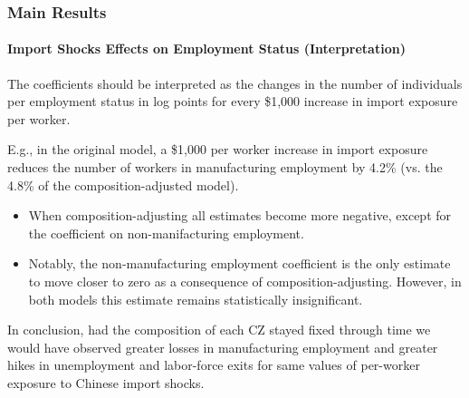 \begin{frame}
    \frametitle{Main Results}
    \framesubtitle{Import Shocks Effects on Employment Status (Interpretation)}
    
    The coefficients should be interpreted as the changes in the number of individuals per employment status in log points for every \$1,000 increase in import exposure per worker.

    E.g., in the original model, a \$1,000 per worker increase in import exposure reduces the number of workers in manufacturing employment by 4.2\% (vs. the 4.8\% of the composition-adjusted model).

    \begin{itemize}
        \item When composition-adjusting all estimates become more negative, except for the coefficient on non-manifacturing employment.
        \item Notably, the non-manufacturing employment coefficient is the only estimate to move closer to zero as a consequence of composition-adjusting. However, in both models this estimate remains statistically insignificant.
    \end{itemize}

    In conclusion, had the composition of each CZ stayed fixed through time we would have observed greater losses in manufacturing employment and greater hikes in unemployment and labor-force exits for same values of per-worker exposure to Chinese import shocks.
\end{frame}

